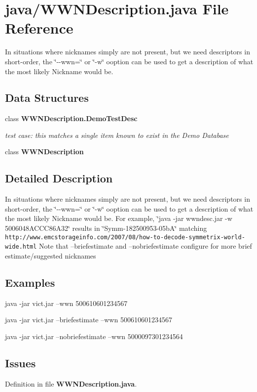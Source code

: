 \section{java/\-W\-W\-N\-Description.java File Reference}
\label{WWNDescription_8java}


In situations where nicknames simply are not present, but we need descriptors in short-\/order, the \char`\"{}-\/-\/wwn=\char`\"{} or \char`\"{}-\/w\char`\"{} ooption can be used to get a description of what the most likely Nickname would be.  


\subsection*{Data Structures}
\begin{DoxyCompactItemize}
\item 
class {\bf W\-W\-N\-Description.\-Demo\-Test\-Desc}
\begin{DoxyCompactList}\small\item\em test case\-: this matches a single item known to exist in the Demo Database \end{DoxyCompactList}\item 
class {\bf W\-W\-N\-Description}
\end{DoxyCompactItemize}


\subsection{Detailed Description}
In situations where nicknames simply are not present, but we need descriptors in short-\/order, the \char`\"{}-\/-\/wwn=\char`\"{} or \char`\"{}-\/w\char`\"{} ooption can be used to get a description of what the most likely Nickname would be. For example, \char`\"{}java -\/jar wwndesc.\-jar -\/w 5006048\-A\-C\-C\-C86\-A32\char`\"{} results in \char`\"{}\-Symm-\/182500953-\/05b\-A\char`\"{} matching {\tt http\-://www.\-emcstorageinfo.\-com/2007/08/how-\/to-\/decode-\/symmetrix-\/world-\/wide.\-html} Note that --briefestimate and --nobriefestimate configure for more brief estimate/suggested nicknames\subsection{Examples}\label{WWNDescription_8java_Examples}
java -\/jar vict.\-jar --wwn 500610601234567

java -\/jar vict.\-jar --briefestimate --wwn 500610601234567

java -\/jar vict.\-jar --nobriefestimate --wwn 5000097301234564\subsection{Issues}\label{WWNDescription_8java_Known}


Definition in file {\bf W\-W\-N\-Description.\-java}.

